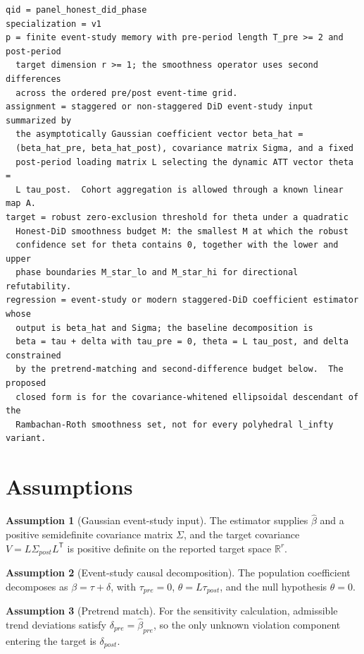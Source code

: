 \documentclass[11pt]{article}
\newcommand{\transpose}{\mathsf{T}}
\newcommand{\R}{\mathbb{R}}
\theoremstyle{definition}
\newtheorem{assumption}{Assumption}
\theoremstyle{plain}
\theoremstyle{remark}
\begin{document}
\begin{verbatim}
qid = panel_honest_did_phase
specialization = v1
p = finite event-study memory with pre-period length T_pre >= 2 and post-period
  target dimension r >= 1; the smoothness operator uses second differences
  across the ordered pre/post event-time grid.
assignment = staggered or non-staggered DiD event-study input summarized by
  the asymptotically Gaussian coefficient vector beta_hat =
  (beta_hat_pre, beta_hat_post), covariance matrix Sigma, and a fixed
  post-period loading matrix L selecting the dynamic ATT vector theta =
  L tau_post.  Cohort aggregation is allowed through a known linear map A.
target = robust zero-exclusion threshold for theta under a quadratic
  Honest-DiD smoothness budget M: the smallest M at which the robust
  confidence set for theta contains 0, together with the lower and upper
  phase boundaries M_star_lo and M_star_hi for directional refutability.
regression = event-study or modern staggered-DiD coefficient estimator whose
  output is beta_hat and Sigma; the baseline decomposition is
  beta = tau + delta with tau_pre = 0, theta = L tau_post, and delta constrained
  by the pretrend-matching and second-difference budget below.  The proposed
  closed form is for the covariance-whitened ellipsoidal descendant of the
  Rambachan-Roth smoothness set, not for every polyhedral l_infty variant.
\end{verbatim}

\section{Assumptions}
\begin{assumption}[Gaussian event-study input]\label{ass:gaussian-input}
The estimator supplies \(\widehat\beta\) and a positive semidefinite covariance matrix \(\Sigma\), and the target covariance \(V=L\Sigma_{post}L^\transpose\) is positive definite on the reported target space \(\R^r\).
\end{assumption}

\begin{assumption}[Event-study causal decomposition]\label{ass:decomposition}
The population coefficient decomposes as \(\beta=\tau+\delta\), with \(\tau_{pre}=0\), \(\theta=L\tau_{post}\), and the null hypothesis \(\theta=0\).
\end{assumption}

\begin{assumption}[Pretrend match]\label{ass:pretrend-match}
For the sensitivity calculation, admissible trend deviations satisfy \(\delta_{pre}=\widehat\beta_{pre}\), so the only unknown violation component entering the target is \(\delta_{post}\).
\end{assumption}
\end{document}
